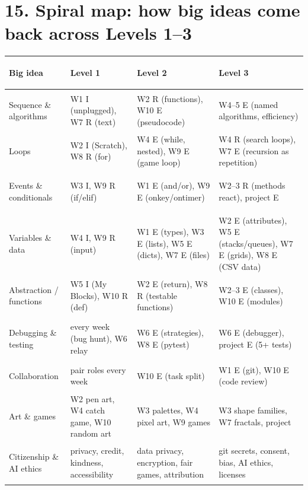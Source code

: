 \documentclass[level=3,teacher]{kidscode}
\begin{document}

\section{15. Spiral map: how big ideas come back across Levels 1--3}

\begingroup\small
\begin{longtable}{@{}>{\bfseries\raggedright\arraybackslash}p{2.6cm}>{\raggedright\arraybackslash}p{3.6cm}>{\raggedright\arraybackslash}p{4.2cm}>{\raggedright\arraybackslash}p{\dimexpr\linewidth-10.4cm-6\tabcolsep}@{}}
\toprule
\rowcolor{kcaccent!15} Big idea & Level 1 & Level 2 & Level 3\\ \midrule\endhead
\bottomrule\endfoot
Sequence \& algorithms & W1 I (unplugged), W7 R (text) & W2 R (functions), W10 E (pseudocode) & W4--5 E (named algorithms, efficiency)\\ \midrule
Loops & W2 I (Scratch), W8 R (for) & W4 E (while, nested), W9 E (game loop) & W4 R (search loops), W7 E (recursion as repetition)\\ \midrule
Events \& conditionals & W3 I, W9 R (if/elif) & W1 E (and/or), W9 E (onkey/ontimer) & W2--3 R (methods react), project E\\ \midrule
Variables \& data & W4 I, W9 R (input) & W1 E (types), W3 E (lists), W5 E (dicts), W7 E (files) & W2 E (attributes), W5 E (stacks/queues), W7 E (grids), W8 E (CSV data)\\ \midrule
Abstraction / functions & W5 I (My Blocks), W10 R (def) & W2 E (return), W8 R (testable functions) & W2--3 E (classes), W10 E (modules)\\ \midrule
Debugging \& testing & every week (bug hunt), W6 relay & W6 E (strategies), W8 E (pytest) & W6 E (debugger), project E (5+ tests)\\ \midrule
Collaboration & pair roles every week & W10 E (task split) & W1 E (git), W10 E (code review)\\ \midrule
Art \& games & W2 pen art, W4 catch game, W10 random art & W3 palettes, W4 pixel art, W9 games & W3 shape families, W7 fractals, project\\ \midrule
Citizenship \& AI ethics & privacy, credit, kindness, accessibility & data privacy, encryption, fair games, attribution & git secrets, consent, bias, AI ethics, licenses\\
\end{longtable}
\endgroup
\end{document}
